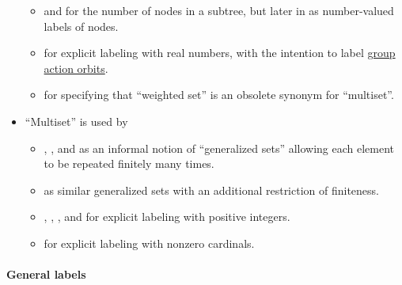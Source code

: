 \begin{remark}
\begin{itemize}
\begin{itemize}
      \item {} and  for the number of nodes in a subtree, but later in  as number-valued labels of nodes.

      \item {} for explicit labeling with real numbers, with the intention to label \hyperref[def:group_action_orbit]{group action orbits}.

      \item {} for specifying that \enquote{weighted set} is an obsolete synonym for \enquote{multiset}.
    \end{itemize}

    \item \enquote{Multiset} is used by
    \begin{itemize}
      \item {}, ,  and  as an informal notion of \enquote{generalized sets} allowing each element to be repeated finitely many times.

      \item {} as similar generalized sets with an additional restriction of finiteness.

      \item {}, , ,  and  for explicit labeling with positive integers.

      \item {} for explicit labeling with nonzero cardinals.
    \end{itemize}
  \end{itemize}
\end{remark}

\paragraph{General labels}

